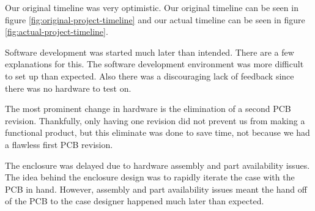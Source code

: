 Our original timeline was very optimistic.  Our original timeline can be seen
in figure \ref{fig:original-project-timeline} and our actual timeline can be
seen in figure \ref{fig:actual-project-timeline}.

Software development was started much later than intended. There are a few
explanations for this.  The software development environment was more
difficult to set up than expected.  Also there was a discouraging lack of
feedback since there was no hardware to test on.

The most prominent change in hardware is the elimination of a second PCB
revision. Thankfully, only having one revision did not prevent us from making a
functional product, but this eliminate was done to save time, not because we
had a flawless first PCB revision.

The enclosure was delayed due to hardware assembly and part availability
issues.  The idea behind the enclosure design was to rapidly iterate the case
with the PCB in hand.  However, assembly and part availability issues meant the
hand off of the PCB to the case designer happened much later than expected.



